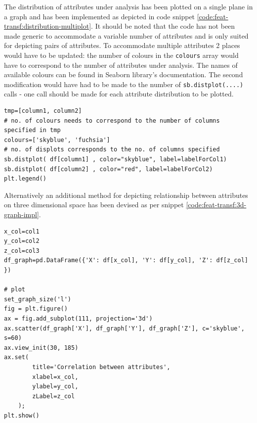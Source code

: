 The distribution of attributes under analysis has been plotted on a single plane in a graph and has been implemented as depicted in code snippet \ref{code:feat-transf:distribution-multiplot}. It should be noted that the code has not been made generic to accommodate a variable number of attributes and is only suited for depicting pairs of attributes. To accommodate multiple attributes 2 places would have to be updated: the number of colours in the \texttt{colours} array would have to correspond to the number of attributes under analysis. The names of available colours can be found in Seaborn library's documentation. The second modification would have had to be made to the number of \texttt{sb.distplot(....)} calls - one call should be made for each attribute distribution to be plotted.
\begin{code}
\label{code:feat-transf:distribution-multiplot}
\begin{verbatim}
tmp=[column1, column2]
# no. of colours needs to correspond to the number of columns specified in tmp
colours=['skyblue', 'fuchsia'] 
# no. of displots corresponds to the no. of columns specified
sb.distplot( df[column1] , color="skyblue", label=labelForCol1)
sb.distplot( df[column2] , color="red", label=labelForCol2)
plt.legend()
\end{verbatim}
\end{code}

Alternatively an additional method for depicting relationship between attributes on three dimensional space has been devised as per snippet \ref{code:feat-transf:3d-graph-impl}.

\begin{code}
\label{code:feat-transf:3d-graph-impl}
\begin{verbatim}
x_col=col1
y_col=col2
z_col=col3
df_graph=pd.DataFrame({'X': df[x_col], 'Y': df[y_col], 'Z': df[z_col] })
 
# plot
set_graph_size('l')
fig = plt.figure()
ax = fig.add_subplot(111, projection='3d')
ax.scatter(df_graph['X'], df_graph['Y'], df_graph['Z'], c='skyblue', s=60)
ax.view_init(30, 185)
ax.set(
        title='Correlation between attributes',
        xlabel=x_col,
        ylabel=y_col,
        zLabel=z_col
    );
plt.show()
\end{verbatim}
\end{code}

\FloatBarrier

